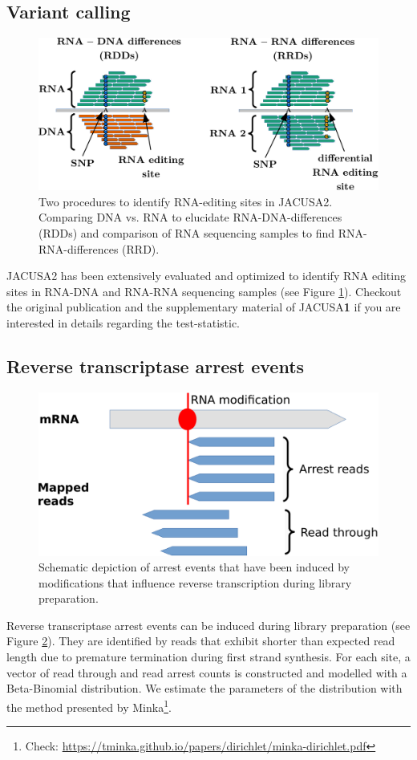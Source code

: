 \documentclass[10pt,a4paper,final]{article}
\begin{document}
\subsection{Variant calling}
\begin{figure}[ht]
  \centering
  \includegraphics[width=.75\textwidth]{figures/dres_cropped}
  \caption{Two procedures to identify RNA-editing sites in JACUSA2. Comparing DNA vs. RNA to elucidate 
  RNA-DNA-differences (RDDs) and comparison of RNA sequencing samples to find RNA-RNA-differences (RRD).}
  \label{fig:dres}
\end{figure}
JACUSA2 has been extensively evaluated and optimized to identify RNA editing sites in RNA-DNA and
RNA-RNA sequencing samples (see Figure \ref{fig:dres}). Checkout the original publication and the
supplementary material of JACUSA\textbf{1} \cite{Piechotta2017} if you are interested in details regarding
the test-statistic.
\subsection{Reverse transcriptase arrest events}
\begin{figure}[ht]
  \centering
  \includegraphics[width=.6\textwidth]{figures/arrest_events_cropped}
  \caption{Schematic depiction of arrest events that have been induced by modifications that
  influence reverse transcription during library preparation.}
  \label{fig:arrest_event}
\end{figure}
Reverse transcriptase arrest events can be induced during library preparation (see Figure
\ref{fig:arrest_event}).
They are identified by reads that exhibit shorter than expected read length due to premature
termination during first strand synthesis. For each site, a vector of read through and read arrest
counts is constructed and modelled with a Beta-Binomial distribution. We estimate the parameters of
the distribution with the method presented by Minka\footnote{Check:
\url{https://tminka.github.io/papers/dirichlet/minka-dirichlet.pdf}}.
\end{document}
